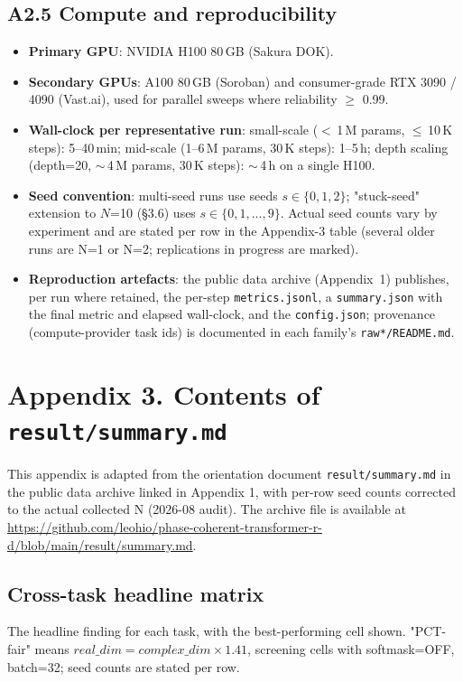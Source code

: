 \documentclass[11pt,a4paper]{article}
\theoremstyle{plain}
\theoremstyle{definition}
\begin{document}
\subsection*{A2.5 Compute and reproducibility}
\begin{itemize}
  \item \textbf{Primary GPU}: NVIDIA H100 80\,GB (Sakura DOK).
  \item \textbf{Secondary GPUs}: A100 80\,GB (Soroban) and consumer-grade RTX 3090 / 4090 (Vast.ai), used for parallel sweeps where reliability $\ge$ 0.99.
  \item \textbf{Wall-clock per representative run}: small-scale ($<$\,1\,M params, $\le$\,10\,K steps): 5--40\,min; mid-scale (1--6\,M params, 30\,K steps): 1--5\,h; depth scaling (depth=20, $\sim$\,4\,M params, 30\,K steps): $\sim$\,4\,h on a single H100.
  \item \textbf{Seed convention}: multi-seed runs use seeds $s \in \{0, 1, 2\}$; "stuck-seed" extension to $N$=10 (\S 3.6) uses $s \in \{0, 1, \ldots, 9\}$. Actual seed counts vary by experiment and are stated per row in the Appendix-3 table (several older runs are N=1 or N=2; replications in progress are marked).
  \item \textbf{Reproduction artefacts}: the public data archive (Appendix~1) publishes, per run where retained, the per-step \texttt{metrics.jsonl}, a \texttt{summary.json} with the final metric and elapsed wall-clock, and the \texttt{config.json}; provenance (compute-provider task ids) is documented in each family's \texttt{raw*/README.md}.
\end{itemize}

\medskip

\section*{Appendix 3. Contents of \texttt{result/summary.md}}
This appendix is adapted from the orientation document \texttt{result/summary.md} in the public data archive linked in Appendix 1, with per-row seed counts corrected to the actual collected N (2026-08 audit). The archive file is available at \url{https://github.com/leohio/phase-coherent-transformer-r-d/blob/main/result/summary.md}.

\subsection*{Cross-task headline matrix}
The headline finding for each task, with the best-performing cell shown. "PCT-fair" means $real\_dim = complex\_dim \times 1.41$, screening cells with softmask=OFF, batch=32; seed counts are stated per row.
\end{document}
